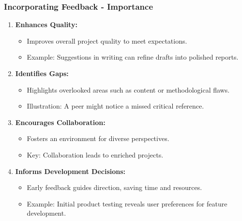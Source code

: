 \documentclass[aspectratio=169]{beamer}
\begin{document}
\begin{frame}[fragile]
  \frametitle{Incorporating Feedback - Importance}
  \begin{enumerate}
    \item \textbf{Enhances Quality:}
      \begin{itemize}
        \item Improves overall project quality to meet expectations.
        \item Example: Suggestions in writing can refine drafts into polished reports.
      \end{itemize}
    \item \textbf{Identifies Gaps:}
      \begin{itemize}
        \item Highlights overlooked areas such as content or methodological flaws.
        \item Illustration: A peer might notice a missed critical reference.
      \end{itemize}
    \item \textbf{Encourages Collaboration:}
      \begin{itemize}
        \item Fosters an environment for diverse perspectives.
        \item Key: Collaboration leads to enriched projects.
      \end{itemize}
    \item \textbf{Informs Development Decisions:}
      \begin{itemize}
        \item Early feedback guides direction, saving time and resources.
        \item Example: Initial product testing reveals user preferences for feature development.
      \end{itemize}
  \end{enumerate}
\end{frame}
\end{document}
